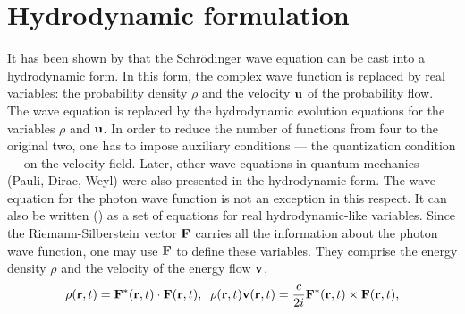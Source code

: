 \documentclass[11pt]{article}
\begin{document}
\section{Hydrodynamic formulation\label{hydrodynamic}}

It has been shown by \cite{Madelung_26} that the Schr\"odinger wave equation
can be cast into a hydrodynamic form. In this form, the complex wave
function is replaced by real variables: the probability density $\rho$ and
the velocity ${\bf u}$ of the probability flow. The wave equation is
replaced by the hydrodynamic evolution equations for the variables $\rho$
and ${\bf u}$. In order to reduce the number of functions from four to the
original two, one has to impose auxiliary conditions --- the quantization
condition --- on the velocity field. Later, other wave equations in quantum
mechanics (Pauli, Dirac, Weyl) were also presented in the hydrodynamic form.
The wave equation for the photon wave function is not an exception in this
respect. It can also be written (\cite{IBB_96b}) as a set of equations for
real hydrodynamic-like variables. Since the Riemann-Silberstein vector ${\bf
F}$ carries all the information about the photon wave function, one may use
${\bf F}$ to define these variables. They comprise the energy density $\rho$
and the velocity of the energy flow ${\bf v}$,
\begin{eqnarray}
 \rho({\bf r},t) = {\bf F}^*({\bf r},t)\cdot{\bf F}({\bf r},t),\;\;
 \rho({\bf r},t){\bf v}({\bf r},t)
 = \frac{c}{2i}{\bf F}^*({\bf r},t)\times{\bf F}({\bf r},t),
\end{eqnarray}
\end{document}
